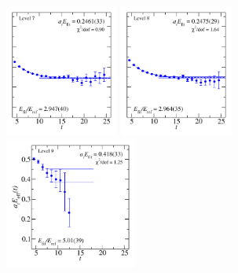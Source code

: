 \documentclass[varwidth,convert]{standalone}
\begin{document}
\hspace{-0.23cm}
\includegraphics[width=0.28\textwidth]{fit_7.pdf}
\includegraphics[width=0.28\textwidth]{fit_8.pdf}\\[-0.4cm]
\includegraphics[width=0.325\textwidth]{fit_9.pdf}
\end{document}
